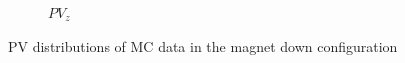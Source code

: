 \begin{figure}[h]
\begin{subfigure}{0.49\textwidth}
		\caption{$PV_z$}
		\label{fig: pv_distributions mc mag down z}
	\end{subfigure}
	\caption{PV distributions of MC data in the magnet down configuration}
	\label{fig: pv distributions mc mag down}
\end{figure}